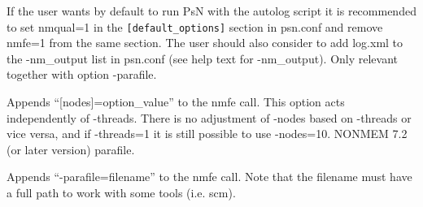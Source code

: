 \begin{optionlist}
If the user wants by default to run PsN with the autolog script it is recommended to set nmqual=1 in the 
\verb|[default_options]| section in psn.conf and remove nmfe=1 from the same section. The user should also consider to add log.xml to the -nm\_output list in psn.conf (see help text for -nm\_output).
\nextopt
{}
Only relevant together with option -parafile. 

Appends “[nodes]=option\_value” to the nmfe call. This option acts independently of -threads. There is no adjustment of -nodes based on -threads or vice versa, and if -threads=1 it is still possible to use -nodes=10. 
\nextopt
{}
NONMEM 7.2 (or later version) parafile.

Appends “-parafile=filename” to the nmfe call. 
    Note that the filename must have a full path to work with some tools (i.e. scm).
\nextopt
\end{optionlist}
